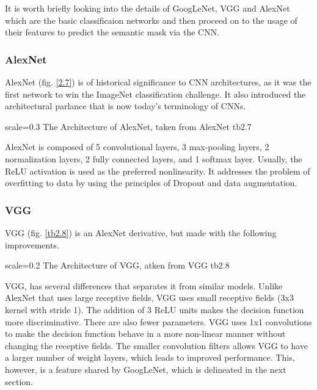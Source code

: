 It is worth briefly looking into the details of GoogLeNet, VGG and AlexNet which are the basic classificaion networks and then proceed on to the usage of their features to predict the semantic mask via the CNN. 

\subsubsection{AlexNet}
AlexNet (fig. \ref{2.7}) is of historical significance to CNN architectures, as it was the first network to win the ImageNet classification challenge. It also introduced the architectural parlance that is now today's terminology of CNNs. 

{scale=0.3}%
{The Architecture of AlexNet, taken from \cite{Krizhevsky2012}}%
{AlexNet}%
{tb2.7} %

AlexNet is composed of 5 convolutional layers, 3 max-pooling layers, 2 normalization layers, 2 fully connected layers, and 1 softmax layer. Usually, the ReLU activation is used as the preferred nonlinearity. It addresses the problem of overfitting to data by using the principles of Dropout and data augmentation. 

\subsubsection{VGG}

VGG (fig. \ref{tb2.8}) is an AlexNet derivative, but made with the following improvements.

{scale=0.2}%
{The Architecture of VGG, atken from \cite{Simonyan2015}}%
{VGG}%
{tb2.8} %

VGG, has several differences that separates it from similar models. 
Unlike AlexNet that uses large receptive fields, VGG uses small receptive fields (3x3 kernel with stride 1). The addition of 3 ReLU units makes the decision function more discriminative. There are also fewer parameters. VGG uses 1x1 convolutions to make the decision function behave in a more non-linear manner without changing the receptive fields.
The smaller convolution filters allows VGG to have a larger number of weight layers, which leads to improved performance. This, however, is a feature shared by GoogLeNet, which is delineated in the next section. 

